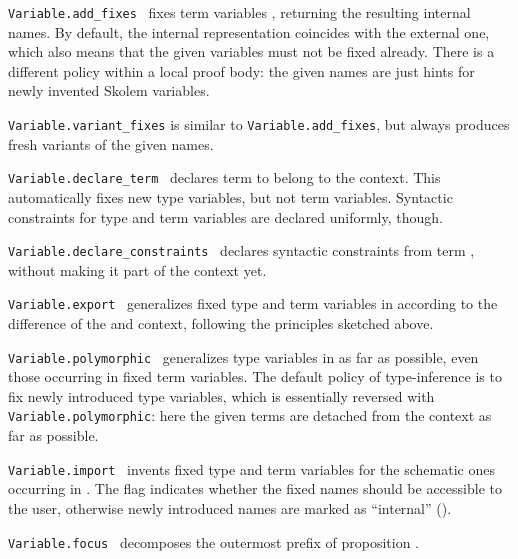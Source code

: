 \begin{isabellebody}
\begin{isamarkuptext}
  \begin{description}

  \item \verb|Variable.add_fixes|~ fixes term
  variables , returning the resulting internal names.  By
  default, the internal representation coincides with the external
  one, which also means that the given variables must not be fixed
  already.  There is a different policy within a local proof body: the
  given names are just hints for newly invented Skolem variables.

  \item \verb|Variable.variant_fixes| is similar to \verb|Variable.add_fixes|, but always produces fresh variants of the given
  names.

  \item \verb|Variable.declare_term|~ declares term
   to belong to the context.  This automatically fixes new
  type variables, but not term variables.  Syntactic constraints for
  type and term variables are declared uniformly, though.

  \item \verb|Variable.declare_constraints|~ declares
  syntactic constraints from term , without making it part
  of the context yet.

  \item \verb|Variable.export|~ generalizes
  fixed type and term variables in  according to the
  difference of the  and  context,
  following the principles sketched above.

  \item \verb|Variable.polymorphic|~ generalizes type
  variables in  as far as possible, even those occurring
  in fixed term variables.  The default policy of type-inference is to
  fix newly introduced type variables, which is essentially reversed
  with \verb|Variable.polymorphic|: here the given terms are detached
  from the context as far as possible.

  \item \verb|Variable.import|~ invents fixed
  type and term variables for the schematic ones occurring in .  The  flag indicates whether the fixed names
  should be accessible to the user, otherwise newly introduced names
  are marked as ``internal'' ().

  \item \verb|Variable.focus|~ decomposes the outermost  prefix of proposition .


\end{description}
\end{isamarkuptext}
\end{isabellebody}
